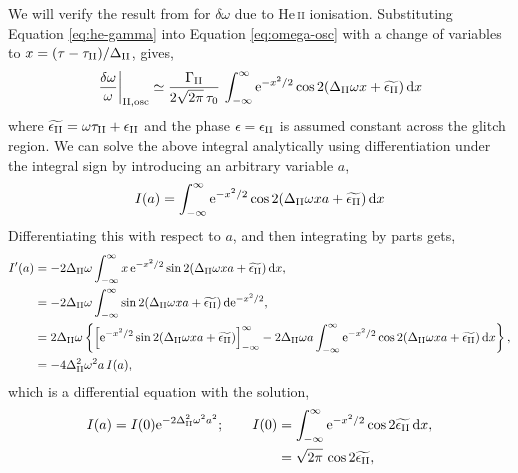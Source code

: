 We will verify the result from \citet{Houdek.Gough2007} for \(\delta\omega\) due to He\,\textsc{ii} ionisation. Substituting Equation \ref{eq:he-gamma} into Equation \ref{eq:omega-osc} with a change of variables to \(x = (\tau - \tau_{{\mathrm{II}}})/\Delta_{{\mathrm{II}}}\), gives,
%
\begin{equation}
    \left.\frac{\delta\omega}{\omega}\right|_{{\mathrm{II}}, \mathrm{osc}} \simeq \frac{\Gamma_{{\mathrm{II}}}}{2\sqrt{2\pi} \, \tau_0} \, \int_{-\infty}^\infty \mathrm{e}^{- x^2/2} \cos 2 (\Delta_{{\mathrm{II}}} \omega x + \widetilde{\epsilon_{{\mathrm{II}}}}) \, \mathrm{d} x \label{eq:omega-ii-osc}
\end{equation}
%
where \(\widetilde{\epsilon_{{\mathrm{II}}}} = \omega\tau_{{\mathrm{II}}} + \epsilon_{{\mathrm{II}}}\) and the phase \(\epsilon=\epsilon_{{\mathrm{II}}}\) is assumed constant across the glitch region. We can solve the above integral analytically using differentiation under the integral sign by introducing an arbitrary variable \(a\),
%
\begin{equation}
    I(a) = \int_{-\infty}^\infty \mathrm{e}^{- x^2/2 } \cos 2 (\Delta_{{\mathrm{II}}} \omega x a + \widetilde{\epsilon_{{\mathrm{II}}}}) \, \mathrm{d} x
\end{equation}
%
Differentiating this with respect to \(a\), and then integrating by parts gets,
%
\begin{align}
    I'(a) &= - 2 \Delta_{{\mathrm{II}}} \omega \int_{-\infty}^\infty x \, \mathrm{e}^{- x^2/2 } \sin 2 (\Delta_{{\mathrm{II}}} \omega x a + \widetilde{\epsilon_{{\mathrm{II}}}}) \, \mathrm{d} x, \notag\\
    &= - 2 \Delta_{{\mathrm{II}}} \omega \int_{-\infty}^\infty \sin 2 (\Delta_{{\mathrm{II}}} \omega x a + \widetilde{\epsilon_{{\mathrm{II}}}}) \, \mathrm{d}\mathrm{e}^{- x^2/2 }, \notag\\
    &= 2 \Delta_{{\mathrm{II}}} \omega \left\{ \left[ \mathrm{e}^{- x^2/2 } \sin 2 (\Delta_{{\mathrm{II}}} \omega x a + \widetilde{\epsilon_{{\mathrm{II}}}}) \right]_{-\infty}^\infty - 2 \Delta_{{\mathrm{II}}} \omega a \int_{-\infty}^\infty \mathrm{e}^{- x^2/2 } \cos 2 (\Delta_{{\mathrm{II}}} \omega x a + \widetilde{\epsilon_{{\mathrm{II}}}}) \, \mathrm{d} x \right\}, \notag\\
    &= - 4 \Delta_{{\mathrm{II}}}^2 \omega^2 a \, I(a),
\end{align}
%
which is a differential equation with the solution,
%
\begin{equation}
    \begin{split}
        I(a) = I(0) \mathrm{e}^{- 2 \Delta_{{\mathrm{II}}}^2 \omega^2 a^2}; \qquad I(0) &= \int_{-\infty}^\infty \mathrm{e}^{- x^2/2 } \cos 2 \widetilde{\epsilon_{{\mathrm{II}}}} \, \mathrm{d} x, \\
        &= \sqrt{2\pi} \, \cos 2 \widetilde{\epsilon_{{\mathrm{II}}}},
    \end{split}
\end{equation}

